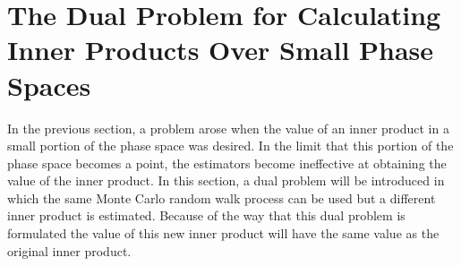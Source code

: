 \section{The Dual Problem for Calculating Inner Products Over Small Phase 
  Spaces}
\label{sec:dual_problems}
In the previous section, a problem arose when the value of an inner product
in a small portion of the phase space was desired. In the limit that this 
portion of the phase space becomes a point, the estimators become ineffective 
at obtaining the value of the inner product. In this section, a dual problem 
will be introduced in which the same Monte Carlo random walk process can be 
used but a different inner product is estimated. Because of the way that this
dual problem is formulated the value of this new inner product will have the 
same value as the original inner product. 

